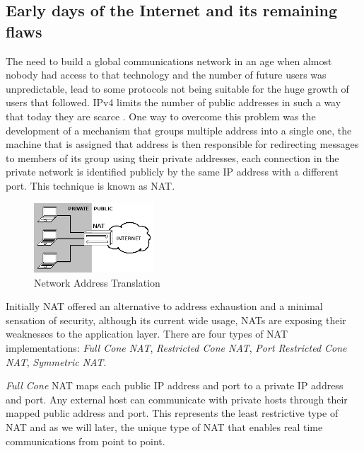 \subsection{Early days of the Internet and its remaining flaws}\label{early}

The need to build a global communications network in an age when almost nobody had access to that technology and the number of future users was unpredictable, lead to some protocols not being suitable for the huge growth of users that followed. \ac{IPv4} limits the number of public addresses in such a way that today they are scarce \cite{ipv4}. One way to overcome this problem was the development of a mechanism that groups multiple address into a single one, the machine that is assigned that address is then responsible for redirecting messages to members of its group using their private addresses, each connection in the private network is identified publicly by the same \ac{IP} address with a different port.
This technique is known as \ac{NAT}.

\begin{figure}[H]
	\centering
	\includegraphics[width=0.4\textwidth]{figures/nat.png}
	\caption{Network Address Translation}
\end{figure}

Initially \ac{NAT} offered an alternative to address exhaustion and a minimal sensation of security, although its current wide usage, \ac{NAT}s are exposing their weaknesses to the application layer.
There are four types of \ac{NAT} implementations\cite{rfc3489}: \emph{Full Cone NAT}, \emph{Restricted Cone NAT}, \emph{Port Restricted Cone NAT}, \emph{Symmetric NAT}.

\emph{Full Cone} \ac{NAT} maps each public \ac{IP} address and port to a private \ac{IP} address and port.
Any external host can communicate with private hosts through their mapped public address and port. This represents the least restrictive type of \ac{NAT} and as we will later, the unique type of \ac{NAT} that enables real time communications from point to point.

